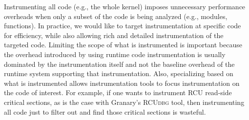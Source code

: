 \documentclass[preprint]{sigplanconf}
\newcommand{\toolname}[1]{{\scshape #1}}
\begin{document}


Instrumenting all code (e.g., the whole kernel) imposes unnecessary performance overheads when only a subset of the code is being analyzed (e.g., modules, functions). In practice, we would like to target instrumentation at specific code for efficiency, while also allowing rich and detailed instrumentation of the targeted code. Limiting the scope of what is instrumented is  important because the overhead introduced by using runtime code instrumentation is usually dominated by the instrumentation itself and not the baseline overhead of the runtime system supporting that instrumentation. Also, specializing based on what is instrumented allows instrumentation tools to focus instrumentation on the code of interest. For example, if one wants to instrument RCU read-side critical sections, as is the case with Granary's \toolname{RCUdbg} tool, then instrumenting all code just to filter out and find those critical sections is wasteful.
\end{document}
